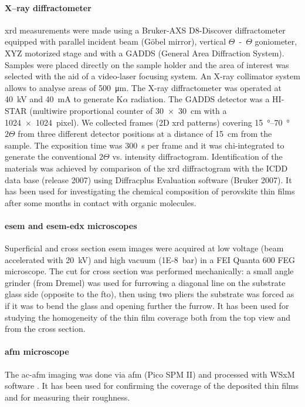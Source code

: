 		\paragraph{X--ray diffractometer} \gls{xrd} measurements were made using a Bruker-AXS D8-Discover diffractometer equipped with parallel incident beam (Göbel mirror), vertical $\Theta$~-~$\Theta$ goniometer, XYZ motorized stage and with a GADDS (General Area Diffraction System). Samples were placed directly on the sample holder and the area of interest was selected with the aid of a video-laser focusing  system. An X-ray collimator system allows to analyse areas of \SI{500}{\um}. The X-ray diffractometer was operated at \SI{40}{\kV} and \SI{40}{\mA} to generate  K$\alpha$ radiation. The GADDS detector was a HI-STAR (multiwire proportional counter of \SI{30x30}{\cm} with a \SI{1024x1024}{pixel}). We collected frames (2D \gls{xrd} patterns) covering \SIrange{15}{70}{\degree} $2\Theta$ from three different detector positions at a distance of \SI{15}{\cm} from the sample. The exposition time was \SI{300}{\s} per frame and it was chi-integrated to generate the conventional $2\Theta$ vs. intensity diffractogram. Identification of the materials was achieved by comparison of the \gls{xrd} diffractogram with the ICDD data base (release 2007) using Diffracplus Evaluation software (Bruker 2007).
		It has been used for investigating the chemical composition of perovskite thin films after some months in contact with organic molecules.

		\paragraph{\Acrshort{esem} and \acrshort{esem}-\acrshort{edx} microscopes} Superficial and cross section \gls{esem} images were acquired at low voltage (beam accelerated with \SI{20}{\kV}) and high vacuum (\SI{1E-8}{\bar}) in a FEI Quanta 600 FEG microscope. The cut for cross section was performed mechanically: a small angle grinder (from Dremel) was used for furrowing a diagonal line on the substrate glass side (opposite to the \gls{fto}), then using two pliers the substrate was forced as if it was to bend the glass and opening further the furrow.
		It has been used for studying the homogeneity of the thin film coverage both from the top view and from the cross section.

		\paragraph{\Acrshort{afm} microscope} The \acrfull{ac-afm} imaging was done via \gls{afm} (Pico SPM II) and processed with WSxM software \cite{Horcas2007}.
		It has been used for confirming the coverage of the deposited thin films and for measuring their roughness.

